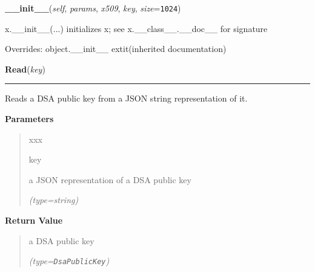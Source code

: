     \vspace{0.5ex}

\hspace{.8\funcindent}\begin{boxedminipage}{\funcwidth}

    \raggedright \textbf{\_\_init\_\_}(\textit{self}, \textit{params}, \textit{x509}, \textit{key}, \textit{size}={\tt 1024})

\setlength{\parskip}{2ex}
    x.\_\_init\_\_(...) initializes x; see x.\_\_class\_\_.\_\_doc\_\_ for 
    signature

\setlength{\parskip}{1ex}
      Overrides: object.\_\_init\_\_ 	extit{(inherited documentation)}

    \end{boxedminipage}

    \label{keyczar:keys:DsaPublicKey:Read}

    \vspace{0.5ex}

\hspace{.8\funcindent}\begin{boxedminipage}{\funcwidth}

    \raggedright \textbf{Read}(\textit{key})

    \vspace{-1.5ex}

    \rule{\textwidth}{0.5\fboxrule}
\setlength{\parskip}{2ex}
    Reads a DSA public key from a JSON string representation of it.

\setlength{\parskip}{1ex}
      \textbf{Parameters}
      \vspace{-1ex}

      \begin{quote}
        \begin{Ventry}{xxx}

          \item[key]

          a JSON representation of a DSA public key

            {\it (type=string)}

        \end{Ventry}

      \end{quote}

      \textbf{Return Value}
    \vspace{-1ex}

      \begin{quote}
      a DSA public key

      {\it (type=\texttt{DsaPublicKey})}

      \end{quote}

    \end{boxedminipage}

